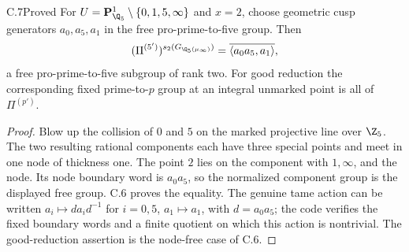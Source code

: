\begin{claim}{C.7}{Proved}
For $U=\mathbf P^1_{\Q_5}\setminus\{0,1,5,\infty\}$ and $x=2$, choose
geometric cusp generators $a_0,a_5,a_1$ in the free pro-prime-to-five group.
Then
\[
 (\Pi^{(5')})^{s_2(G_{\Q_5(\mu_\infty)})}
 =\overline{\langle a_0a_5,a_1\rangle},
\]
a free pro-prime-to-five subgroup of rank two. For good reduction the
corresponding fixed prime-to-$p$ group at an integral unmarked point is
all of $\Pi^{(p')}$.
\end{claim}
\begin{proof}
Blow up the collision of $0$ and $5$ on the marked projective line over
$\Z_5$. The two resulting rational components each have three special
points and meet in one node of thickness one. The point $2$ lies on the
component with $1,\infty$, and the node. Its node boundary word is
$a_0a_5$, so the normalized component group is the displayed free group.
C.6 proves the equality. The genuine tame action can be written
$a_i\mapsto d a_i d^{-1}$ for $i=0,5$, $a_1\mapsto a_1$, with
$d=a_0a_5$; the code verifies the fixed boundary words and a finite quotient
on which this action is nontrivial. The good-reduction assertion is the
node-free case of C.6.
\end{proof}









